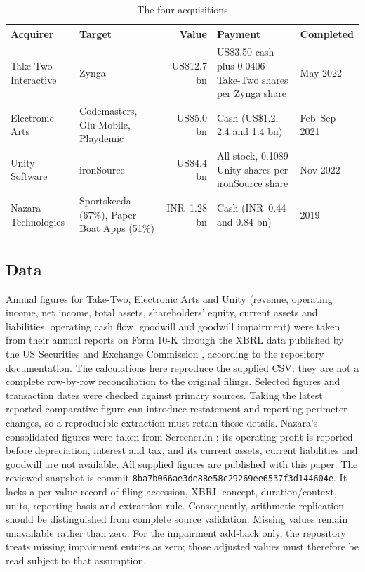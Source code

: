 \documentclass[11pt]{article}
\newcommand{\botrule}{\bottomrule}
\newcommand{\USD}{US\$}
\newcommand{\INR}{INR~}
\begin{document}
\begin{table}[h]
\caption{The four acquisitions}\label{tab:deals}
\footnotesize
\setlength{\tabcolsep}{4pt}
\begin{tabular}{@{}p{2.2cm}p{2.5cm}rp{3.8cm}l@{}}
\toprule
Acquirer & Target & Value & Payment & Completed \\
\midrule
Take-Two Interactive & Zynga & \USD 12.7 bn & \USD 3.50 cash plus 0.0406 Take-Two shares per Zynga share & May 2022 \\
Electronic Arts & Codemasters, Glu Mobile, Playdemic & \USD 5.0 bn & Cash (\USD 1.2, 2.4 and 1.4 bn) & Feb--Sep 2021 \\
Unity Software & ironSource & \USD 4.4 bn & All stock, 0.1089 Unity shares per ironSource share & Nov 2022 \\
Nazara Technologies & Sportskeeda (67\%), Paper Boat Apps (51\%) & \INR 1.28 bn & Cash (\INR 0.44 and 0.84 bn) & 2019 \\
\botrule
\end{tabular}
\par{}
\end{table}

\subsection{Data}

Annual figures for Take-Two, Electronic Arts and Unity (revenue, operating income, net income, total assets, shareholders' equity, current assets and liabilities, operating cash flow, goodwill and goodwill impairment) were taken from their annual reports on Form 10-K through the XBRL data published by the US Securities and Exchange Commission \citep{secttwo,secea,secunity}, according to the repository documentation. The calculations here reproduce the supplied CSV; they are not a complete row-by-row reconciliation to the original filings. Selected figures and transaction dates were checked against primary sources. Taking the latest reported comparative figure can introduce restatement and reporting-perimeter changes, so a reproducible extraction must retain those details. Nazara's consolidated figures were taken from Screener.in \citep{screener}; its operating profit is reported before depreciation, interest and tax, and its current assets, current liabilities and goodwill are not available. All supplied figures are published with this paper. The reviewed snapshot is commit \texttt{8ba7b066ae3de88e58c29269ee6537f3d144604e}. It lacks a per-value record of filing accession, XBRL concept, duration/context, units, reporting basis and extraction rule. Consequently, arithmetic replication should be distinguished from complete source validation. Missing values remain unavailable rather than zero. For the impairment add-back only, the repository treats missing impairment entries as zero; those adjusted values must therefore be read subject to that assumption.
\end{document}
